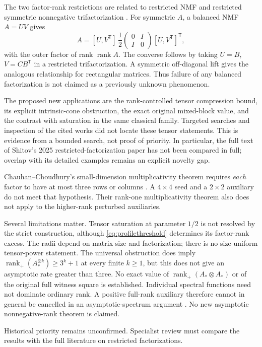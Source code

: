\documentclass[11pt]{article}
\theoremstyle{definition}\newtheorem{definition}[theorem]{Definition}
\theoremstyle{remark}\newtheorem{remark}[theorem]{Remark}
\newcommand{\rk}{\operatorname{rank}}
\newcommand{\rp}{\operatorname{rank}_{+}}
\begin{document}
The two factor-rank restrictions are related to restricted NMF \cite{GG} and restricted symmetric nonnegative trifactorization \cite{KS,Shitov25}. For symmetric $A$, a balanced NMF $A=UV$ gives
\[
A=[U,V^{\mathsf T}]\,\frac12\begin{pmatrix}0&I\\I&0\end{pmatrix}[U,V^{\mathsf T}]^{\mathsf T},
\]
with the outer factor of rank $\rk A$. The converse follows by taking $U=B$, $V=CB^{\mathsf T}$ in a restricted trifactorization. A symmetric off-diagonal lift gives the analogous relationship for rectangular matrices. Thus failure of any balanced factorization is not claimed as a previously unknown phenomenon.

The proposed new applications are the rank-controlled tensor compression bound, its explicit intrinsic-cone obstruction, the exact original mixed-block value, and the contrast with saturation in the same classical family. Targeted searches and inspection of the cited works did not locate these tensor statements. This is evidence from a bounded search, not proof of priority. In particular, the full text of Shitov's 2025 restricted-factorization paper has not been compared in full; overlap with its detailed examples remains an explicit novelty gap.

Chauhan--Choudhury's small-dimension multiplicativity theorem requires \emph{each} factor to have at most three rows or columns \cite[Theorem~1.4]{CC}. A $4\times4$ seed and a $2\times2$ auxiliary do not meet that hypothesis. Their rank-one multiplicativity theorem also does not apply to the higher-rank perturbed auxiliaries.

Several limitations matter. Tensor saturation at parameter $1/2$ is not resolved by the strict construction, although \eqref{eq:profilethreshold} determines its factor-rank excess. The radii depend on matrix size and factorization; there is no size-uniform tensor-power statement. The universal obstruction does imply $\rp(A_*^{\otimes k})\ge3^k+1$ at every finite $k\ge1$, but this does not give an asymptotic rate greater than three. No exact value of $\rp(A_*\otimes A_*)$ or of the original full witness square is established. Individual spectral functions need not dominate ordinary rank. A positive full-rank auxiliary therefore cannot in general be cancelled in an asymptotic-spectrum argument \cite{CLT}. No new asymptotic nonnegative-rank theorem is claimed.

Historical priority remains unconfirmed. Specialist review must compare the results with the full literature on restricted factorizations.
\end{document}
